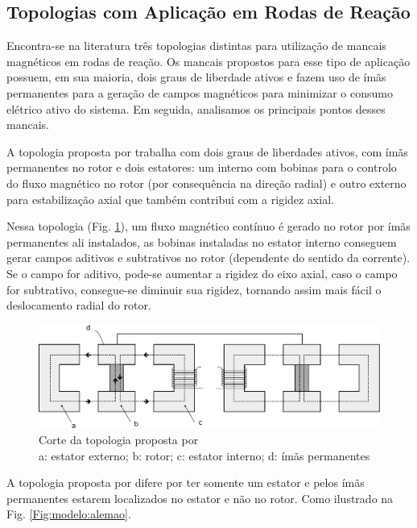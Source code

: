 \subsection{Topologias com Aplicação em Rodas de Reação}

Encontra-se na literatura três topologias distintas para utilização de mancais magnéticos em rodas de reação. Os mancais propostos para esse tipo de aplicação possuem, em sua maioria, dois graus de liberdade ativos e fazem uso de ímãs permanentes para a geração de campos magnéticos para minimizar o consumo elétrico ativo do sistema. Em seguida, analisamos os principais pontos desses mancais.

A topologia proposta por \citet{Bernus1998} trabalha com dois graus de liberdades ativos, com ímãs permanentes no rotor e dois estatores: um interno com bobinas para o controlo do fluxo magnético no rotor (por consequência na direção radial) e outro externo para estabilização axial que também contribui com a rigidez axial. 

Nessa topologia (Fig. \ref{Fig:modelo:frances}), um fluxo magnético contínuo é gerado no rotor por ímãs permanentes ali instalados, as bobinas instaladas no estator interno conseguem gerar campos aditivos e subtrativos no rotor (dependente do sentido da corrente). Se o campo for aditivo, pode-se aumentar a rigidez do eixo axial, caso o campo for subtrativo, consegue-se diminuir sua rigidez, tornando assim mais fácil o deslocamento radial do rotor.

\begin{figure}[!ht]
	\centering
	\includegraphics[width=1\linewidth]{./Figs/mancais/frances}
	\caption{Corte da topologia proposta por \cite{Bernus1998} \\
	a: estator externo; b: rotor; c: estator interno; d: ímãs permanentes}
	\label{Fig:modelo:frances}
\end{figure}

A topologia proposta por \citet{Scharfe2001} difere por ter somente um estator e pelos ímãs permanentes estarem localizados no estator e não no rotor. Como ilustrado na Fig. \ref{Fig:modelo:alemao}. 

